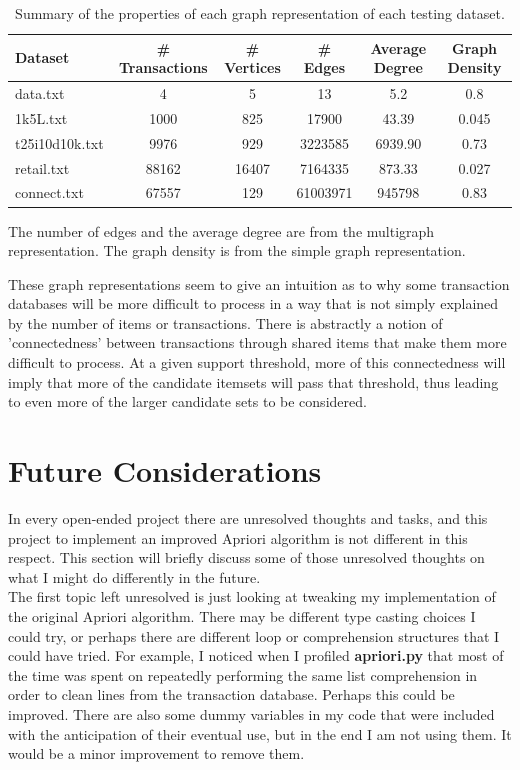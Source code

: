 \documentclass[12 pt]{article}
\begin{document}
\begin{table}[H]
\caption{Summary of the properties of each graph representation of each testing dataset.}
\centering
\begin{tabular}{lccccc}
	\hline
	Dataset & \# Transactions & \# Vertices & \# Edges & Average Degree & Graph Density \\
	\hline
	data.txt & 4 & 5 & 13 & 5.2 & 0.8 \\
	1k5L.txt & 1000 & 825 & 17900 & 43.39 & 0.045 \\
	t25i10d10k.txt & 9976 & 929 & 3223585 & 6939.90 & 0.73 \\
	retail.txt & 88162 & 16407 & 7164335 & 873.33 & 0.027 \\
	connect.txt & 67557 & 129 & 61003971 & 945798 & 0.83 \\
	\hline
\end{tabular}

{\tiny The number of edges and the average degree are from the multigraph representation. The graph density is from the simple graph representation.}
\label{tab:graphs}
\end{table}

These graph representations seem to give an intuition as to why some transaction databases will be more difficult to process in a way that is not simply explained by the number of items or transactions. There is abstractly a notion of 'connectedness' between transactions through shared items that make them more difficult to process. At a given support threshold, more of this connectedness will imply that more of the candidate itemsets will pass that threshold, thus leading to even more of the larger candidate sets to be considered.

\section{Future Considerations}

In every open-ended project there are unresolved thoughts and tasks, and this project to implement an improved Apriori algorithm is not different in this respect. This section will briefly discuss some of those unresolved thoughts on what I might do differently in the future.\\

The first topic left unresolved is just looking at tweaking my implementation of the original Apriori algorithm. There may be different type casting choices I could try, or perhaps there are different loop or comprehension structures that I could have tried. For example, I noticed when I profiled \textbf{apriori.py} that most of the time was spent on repeatedly performing the same list comprehension in order to clean lines from the transaction database. Perhaps this could be improved. There are also some dummy variables in my code that were included with the anticipation of their eventual use, but in the end I am not using them. It would be a minor improvement to remove them.\\
\end{document}
